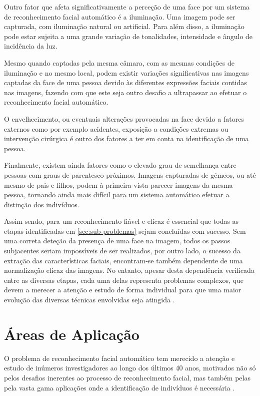 Outro fator que afeta significativamente a perceção de uma face por um sistema de reconhecimento facial automático é a iluminação. Uma imagem pode ser capturada, com iluminação natural ou artificial. Para além disso, a iluminação pode estar sujeita a uma grande variação de tonalidades, intensidade e ângulo de incidência da luz.

Mesmo quando captadas pela mesma câmara, com as mesmas condições de iluminação e no mesmo local, podem existir variações significativas nas imagens captadas da face de uma pessoa devido às diferentes expressões faciais contidas nas imagens, fazendo com que este seja outro desafio a ultrapassar ao efetuar o reconhecimento facial automático.

O envelhecimento, ou eventuais alterações provocadas na face devido a fatores externos como por exemplo acidentes, exposição a condições extremas ou intervenção cirúrgica é outro dos fatores a ter em conta na identificação de uma pessoa.

Finalmente, existem ainda fatores como o elevado grau de semelhança entre pessoas com graus de parentesco próximos. Imagens capturadas de gémeos, ou até mesmo de pais e filhos, podem à primeira vista parecer imagens da mesma pessoa, tornando ainda mais difícil para um sistema automático efetuar a distinção dos indivíduos.

Assim sendo, para um reconhecimento fiável e eficaz é essencial que todas as etapas identificadas em \ref{sec:sub-problemas} sejam concluídas com sucesso. Sem uma correta deteção da presença de uma face na imagem, todos os passos subjacentes seriam impossíveis de ser realizados, por outro lado, o sucesso da extração das características faciais, encontram-se também dependente de uma normalização eficaz das imagens. No entanto, apesar desta dependência verificada entre as diversas etapas, cada uma delas representa problemas complexos, que devem a merecer a atenção e estudo de forma individual para que uma maior evolução das diversas técnicas envolvidas seja atingida \cite{Zhao2003}.


\section{Áreas de Aplicação}\label{sec:areasAplicacao}
O problema de reconhecimento facial automático tem merecido a atenção e estudo de inúmeros investigadores ao longo dos últimos 40 anos, motivados não só pelos desafios inerentes ao processo de reconhecimento facial, mas também pelas pela vasta gama aplicações onde a identificação de indivíduos é necessária \cite{Li2011}.

